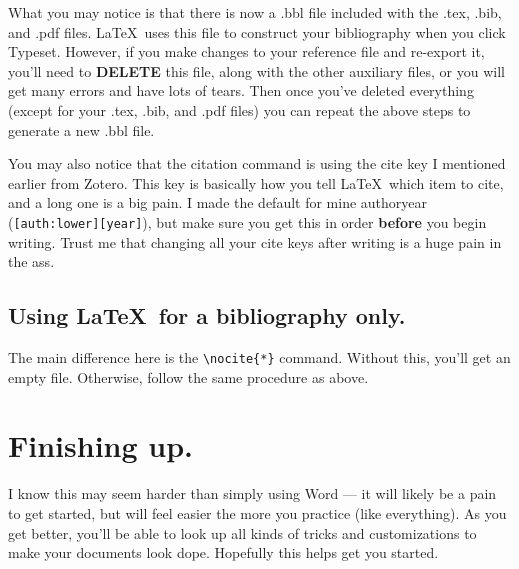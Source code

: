 \documentclass[11pt]{article}
\begin{document}
What you may notice is that there is now a .bbl file included with the .tex, .bib, and .pdf files. \LaTeX\ uses this file to construct your bibliography when you click Typeset. However, if you make changes to your reference file and re-export it, you'll need to \textbf{DELETE} this file, along with the other auxiliary files, or you will get many errors and have lots of tears. Then once you've deleted everything (except for your .tex, .bib, and .pdf files) you can repeat the above steps to generate a new .bbl file.

You may also notice that the citation command is using the cite key I mentioned earlier from Zotero. This key is basically how you tell \LaTeX\ which item to cite, and a long one is a big pain. I made the default for mine authoryear (\verb|[auth:lower][year]|), but make sure you get this in order \textbf{before} you begin writing. Trust me that changing all your cite keys after writing is a huge pain in the ass.

\subsection{Using \LaTeX\ for a bibliography only.}

The main difference here is the \verb|\nocite{*}| command. Without this, you'll get an empty file. Otherwise, follow the same procedure as above.

\section{Finishing up.}

I know this may seem harder than simply using Word --- it will likely be a pain to get started, but will feel easier the more you practice (like everything). As you get better, you'll be able to look up all kinds of tricks and customizations to make your documents look dope. Hopefully this helps get you started.
\end{document}
